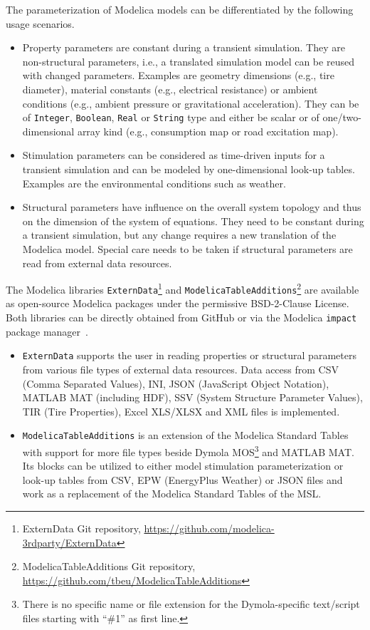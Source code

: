 \documentclass{modelica}
\newcommand{\modelica}[1]{\lstinline[language=modelica]|#1|}
\begin{document}
The parameterization of Modelica models can be differentiated by the following usage scenarios.
\begin{itemize}
 \item Property parameters are constant during a transient simulation. They are non-structural parameters, i.e., a translated simulation model can be reused with changed parameters. Examples are geometry dimensions (e.g., tire diameter), material constants (e.g., electrical resistance) or ambient conditions (e.g., ambient pressure or gravitational acceleration). They can be of \modelica{Integer}, \modelica{Boolean}, \modelica{Real} or \modelica{String} type and either be scalar or of one/two-dimensional array kind (e.g., consumption map or road excitation map).
 \item Stimulation parameters can be considered as time-driven inputs for a transient simulation and can be modeled by one-dimensional look-up tables. Examples are the environmental conditions such as weather.
 \item Structural parameters have influence on the overall system topology and thus on the dimension of the system of equations. They need to be constant during a transient simulation, but any change requires a new translation of the Modelica model. Special care needs to be taken if structural parameters are read from external data resources.
\end{itemize}

The Modelica libraries \modelica{ExternData}\footnote{ExternData Git repository, \url{https://github.com/modelica-3rdparty/ExternData}} and \modelica{ModelicaTableAdditions}\footnote{ModelicaTableAdditions Git repository, \url{https://github.com/tbeu/ModelicaTableAdditions}} are available as open-source Modelica packages under the permissive BSD-2-Clause License.
Both libraries can be directly obtained from GitHub or via the Modelica \modelica{impact} package manager~\cite{Tiller2015WhereIG}.
\begin{itemize}
 \item \modelica{ExternData} supports the user in reading properties or structural parameters from various file types of external data resources.
 Data access from CSV (Comma Separated Values), INI, JSON (JavaScript Object Notation), MATLAB MAT (including HDF), SSV (System Structure Parameter Values), TIR (Tire Properties), Excel XLS/XLSX and XML files is implemented.
 \item \modelica{ModelicaTableAdditions} is an extension of the Modelica Standard Tables~\cite{modelica2014tables} with support for more file types beside Dymola MOS\footnote{There is no specific name or file extension for the Dymola-specific text/script files starting with ``\#1'' as first line.} and MATLAB MAT.
 Its blocks can be utilized to either model stimulation parameterization or look-up tables from CSV, EPW (EnergyPlus Weather) or JSON files and work as a replacement of the Modelica Standard Tables of the MSL.
\end{itemize}
\end{document}
